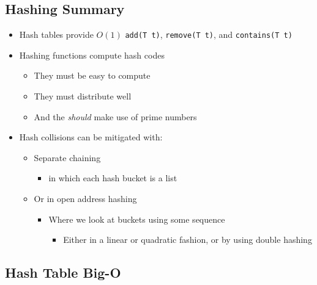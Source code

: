 \documentclass[
  10pt,
  english,
  letterpaper,
,tablecaptionabove
]{scrartcl}
\newcommand{\passthrough}[1]{#1}
\providecommand{\tightlist}{%
  \setlength{\itemsep}{0pt}\setlength{\parskip}{0pt}}
\begin{document}
\hypertarget{hashing-summary}{%
\subsection{Hashing Summary}\label{hashing-summary}}

\begin{itemize}
\tightlist
\item
  Hash tables provide \(O(1)\) \passthrough{\lstinline!add(T t)!},
  \passthrough{\lstinline!remove(T t)!}, and
  \passthrough{\lstinline!contains(T t)!}
\item
  Hashing functions compute hash codes

  \begin{itemize}
  \tightlist
  \item
    They must be easy to compute
  \item
    They must distribute well
  \item
    And the \emph{should} make use of prime numbers
  \end{itemize}
\item
  Hash collisions can be mitigated with:

  \begin{itemize}
  \tightlist
  \item
    Separate chaining

    \begin{itemize}
    \tightlist
    \item
      in which each hash bucket is a list
    \end{itemize}
  \item
    Or in open address hashing

    \begin{itemize}
    \tightlist
    \item
      Where we look at buckets using some sequence

      \begin{itemize}
      \tightlist
      \item
        Either in a linear or quadratic fashion, or by using double
        hashing
      \end{itemize}
    \end{itemize}
  \end{itemize}
\end{itemize}

\hypertarget{hash-table-big-o}{%
\subsection{Hash Table Big-O}\label{hash-table-big-o}}
\end{document}
